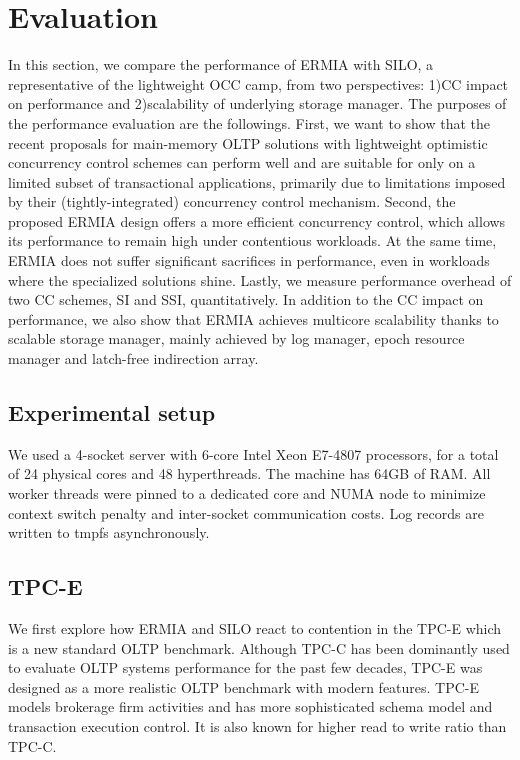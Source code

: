 
\section{Evaluation}
In this section, we compare the performance of ERMIA with SILO, a representative of the lightweight OCC camp, from two perspectives: 1)CC impact on performance and 2)scalability of underlying storage manager. 
The purposes of the performance evaluation are the followings. First, we want to show that the recent proposals for main-memory OLTP solutions with lightweight optimistic concurrency control schemes can perform well and are suitable for only on a limited subset of transactional applications, primarily due to limitations imposed by their (tightly-integrated) concurrency control mechanism. Second, the proposed ERMIA design offers a more efficient concurrency control, which allows its performance to remain high under contentious workloads. At the same time, ERMIA does not suffer significant sacrifices in performance, even in workloads where the specialized solutions shine. Lastly, we measure performance overhead of two CC schemes, SI and SSI, quantitatively. In addition to the CC impact on performance, we also show that ERMIA achieves multicore scalability thanks to scalable storage manager, mainly achieved by log manager, epoch resource manager and latch-free indirection array. 


\subsection{Experimental setup}
We used a 4-socket server with 6-core Intel Xeon E7-4807 processors, for a total of 24 physical cores and 48 hyperthreads. The machine has 64GB of RAM. All worker threads were pinned to a dedicated core and NUMA node to minimize context switch penalty and inter-socket communication costs. Log records are written to tmpfs asynchronously.

\subsection{TPC-E}
We first explore how ERMIA and SILO react to contention in the TPC-E which is a new standard OLTP benchmark. Although TPC-C has been dominantly used to evaluate OLTP systems performance for the past few decades, TPC-E was designed as a more realistic OLTP benchmark with modern features. TPC-E models brokerage firm activities and has more sophisticated schema model and transaction execution control. It is also known for higher read to write ratio than TPC-C. 

